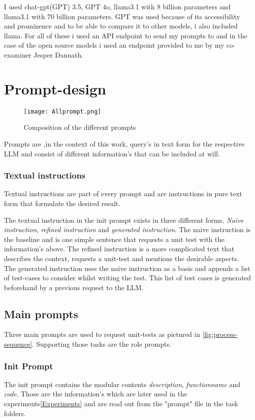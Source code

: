 \documentclass[a4paper,11pt,oneside]{memoir}
\begin{document}
I used chat-gpt(GPT) 3.5, GPT 4o, llama3.1 with 8 billion parameters and llama3.1 with 70 billion parameters. 
GPT was used because of its accessibility and prominence and to be able to compare it to other models, i also included llama. For all of these i used an API endpoint to send my prompts to and in the case of the open source models i used an endpoint provided to me by my co-examiner Jesper Dannath.

\section{Prompt-design}
\begin{figure}
    \centering
    \texttt{[image: Allprompt.png]}
    \caption{Composition of the different prompts}
    \label{fig:all_prompts}
\end{figure}

Prompts are ,in the context of this work, query's in text form for the respective LLM and consist of different information's that can be included at will.

\subsubsection{Textual instructions}
Textual instructions are part of every prompt and are instructions in pure text form that formulate the desired result.

The textual instruction in the init prompt exists in three different forms. \textit{Naive instruction}, \textit{refined instruction} and \textit{generated instruction}. The naive instruction is the baseline and is one simple sentence that requests a unit test with the information's above. The refined instruction is a more complicated text that describes the context, requests a unit-test and mentions the desirable aspects.
The generated instruction uses the naive instruction as a basis and appends a list of test-cases to consider whilst writing the test. This list of test cases is generated beforehand by a previous request to the LLM.

\subsection{Main prompts}
Three main prompts are used to request unit-tests as pictured in \ref{fig:process-sequence}. Supporting those tasks are the role prompts.

\subsubsection{Init Prompt}
The init prompt contains the modular contents \textit{description}, \textit{functionname} and \textit{code}. Those are the information's which are later used in the experiments\ref{Experiments} and are read out from the "prompt" file in the task folders.
\end{document}
